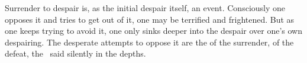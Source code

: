 Surrender to despair is, as the initial despair itself, an
 event.  Consciously one opposes it and tries to get out of
it, one may be terrified and frightened. 
But as one keeps trying to avoid it, one only sinks deeper into the despair
over one's own despairing. The desperate attempts to oppose it are the
 of the surrender, of the  defeat, the \No\ said
silently in the depths.  



\label{sub:mammon} %

